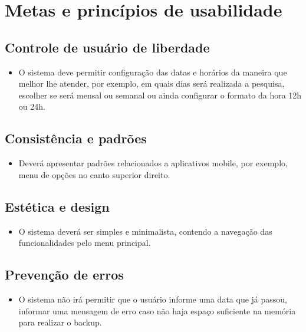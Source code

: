 \chapter[Metas e princípios de usabilidade]{Metas e princípios de usabilidade}

\section{Controle de usuário de liberdade}
\begin{itemize}
	\item O sistema deve permitir configuração das datas e horários da maneira que melhor lhe atender, por exemplo, em quais dias será realizada a pesquisa, escolher se será mensal ou semanal ou ainda configurar o formato da hora 12h ou 24h.
\end{itemize}

\section{Consistência e padrões}
\begin{itemize}
	\item Deverá apresentar padrões relacionados a aplicativos mobile, por exemplo, menu de opções no canto superior direito.
\end{itemize}

\section{Estética e design}
\begin{itemize}
	\item O sistema deverá ser simples e minimalista, contendo a navegação das funcionalidades pelo menu principal.
\end{itemize}

\section{Prevenção de erros}
\begin{itemize}
	\item O sistema não irá permitir que o usuário informe uma data que já passou, informar uma mensagem de erro caso não haja espaço suficiente na memória para realizar o backup.
\end{itemize}